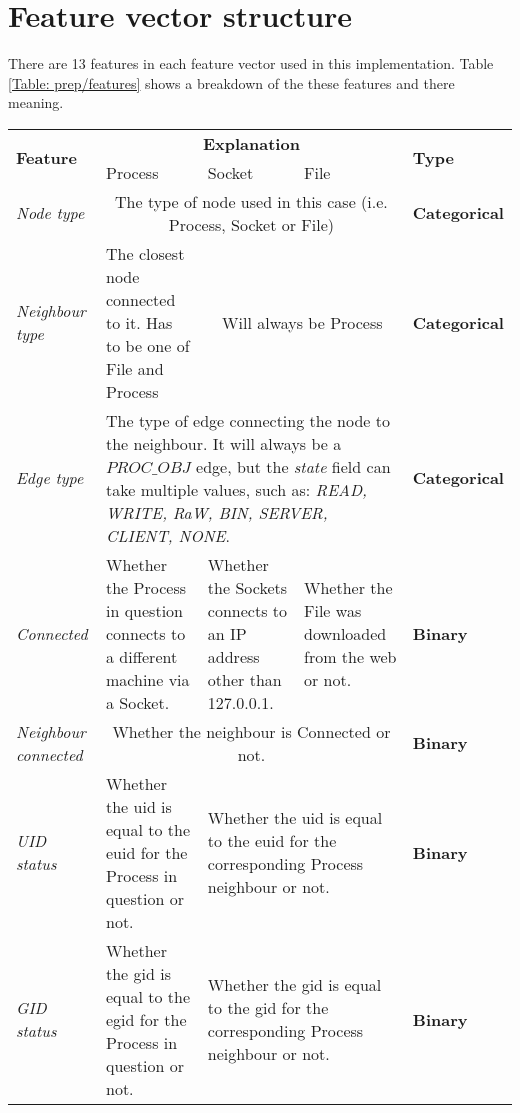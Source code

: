 \chapter{Feature vector structure} \label{Appendix: Feature-vector}
	
	There are 13 features in each feature vector used in this implementation. Table \ref{Table: prep/features} shows a breakdown of the these features and there meaning.
	\begin{longtable}{| p{} || p{} | p{} | p{} | p{} |}
	\hline
	\multirow{2}{3cm}{\textbf{Feature}} & \multicolumn{3}{c|}{\textbf{Explanation}} & \multirow{2}{2cm}{\textbf{Type}}\\
	& Process & Socket & File &\\
	\hline
	\textit{Node type} & \multicolumn{3}{c|}{The type of node used in this case (i.e. Process, Socket or File)} & \textbf{Categorical} \\
	\hline
	\textit{Neighbour type} & The closest node connected to it. Has to be one of File and Process & 
	\multicolumn{2}{c|}{Will always be Process} & \textbf{Categorical}\\
	\hline
	\textit{Edge type} & \multicolumn{3}{p{.75\textwidth}|}{The type of edge connecting the node to the neighbour. It will always be a $PROC\_OBJ$ edge, but the \textit{state} field can take multiple values, such as:  \textit{READ, WRITE, RaW, BIN, SERVER, CLIENT, NONE}.} & \textbf{Categorical}\\
	\hline
	\textit{Connected} & Whether the Process in question connects to a different machine via a Socket. & Whether the Sockets connects to an IP address other than 127.0.0.1. & Whether the File was downloaded from the web or not. & \textbf{Binary} \\
	\hline
	\textit{Neighbour connected} & \multicolumn{3}{c|}{Whether the neighbour is Connected or not.} & \textbf{Binary} \\ 
	\hline
	\textit{UID status} & Whether the uid is equal to the euid for the Process in question or not. & \multicolumn{2}{p{.50\textwidth}|}{Whether the uid is equal to the euid for the corresponding Process neighbour or not.} & \textbf{Binary} \\
	\hline
	\textit{GID status } & Whether the gid is equal to the egid for the Process in question or not. & \multicolumn{2}{p{.50\textwidth}|}{Whether the gid is equal to the gid for the corresponding Process neighbour or not.} & \textbf{Binary} \\

\end{longtable}
